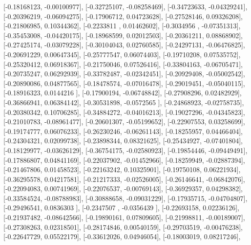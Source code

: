 \documentclass{article}
\begin{document}
       [-0.18168123, -0.00100977],
       [-0.32725107, -0.08258469],
       [-0.34723633, -0.04329241],
       [-0.20396219, -0.06094275],
       [-0.17906712,  0.04723628],
       [-0.27528146,  0.09326208],
       [-0.21806985,  0.10344362],
       [-0.2233811 ,  0.01462602],
       [-0.3034956 , -0.07351313],
       [-0.35453008, -0.04420175],
       [-0.18968599,  0.02012503],
       [-0.20361211,  0.08868902],
       [-0.27425174, -0.03079228],
       [-0.30104043,  0.02760585],
       [-0.24297131, -0.06476825],
       [-0.20691229,  0.00647345],
       [-0.25777547,  0.06074403],
       [-0.19710208,  0.07535752],
       [-0.25320412,  0.06918367],
       [-0.21750046,  0.07526416],
       [-0.33804163, -0.06705471],
       [-0.20735247,  0.06292939],
       [-0.33782487, -0.02342451],
       [-0.20929408, -0.05002542],
       [-0.20890086,  0.04877565],
       [-0.18478574, -0.07016478],
       [-0.29019451, -0.05040115],
       [-0.18916323,  0.0144216 ],
       [-0.17900194, -0.06748842],
       [-0.27908296,  0.02482929],
       [-0.36866941,  0.06384142],
       [-0.30531898, -0.0572565 ],
       [-0.24868923, -0.02758735],
       [-0.20380342,  0.10706285],
       [-0.34884272, -0.04016213],
       [-0.19027296, -0.04345823],
       [-0.21010783, -0.08961477],
       [-0.20601307, -0.05199652],
       [-0.22907553,  0.03258699],
       [-0.19174777,  0.06076233],
       [-0.26230246, -0.06261143],
       [-0.18255957,  0.04466404],
       [-0.24304321,  0.02099738],
       [-0.23898344,  0.08321625],
       [-0.25434927, -0.07401804],
       [-0.18129977, -0.03626129],
       [-0.36754175, -0.02580923],
       [-0.19854446, -0.09449491],
       [-0.17886807,  0.04841169],
       [-0.22037902, -0.01452966],
       [-0.18259949, -0.02887394],
       [-0.21467806,  0.01458523],
       [-0.22163242,  0.10325901],
       [-0.19750108,  0.06221934],
       [-0.36295578,  0.04217581],
       [-0.21217333, -0.02526005],
       [-0.26146641, -0.06842076],
       [-0.22094083,  0.00741969],
       [-0.22076537, -0.00769143],
       [-0.36929357,  0.04298382],
       [-0.33584524, -0.08788983],
       [-0.30888658, -0.09031229],
       [-0.17935715, -0.04704807],
       [-0.29496541,  0.0836303 ],
       [-0.2347507 , -0.0356439 ],
       [-0.22693158,  0.02236126],
       [-0.21937482, -0.08642566],
       [-0.19890161,  0.07809605],
       [-0.21998811, -0.00189007],
       [-0.27308263,  0.02318501],
       [-0.28174846,  0.00540159],
       [-0.29703519, -0.00476238],
       [-0.22647729,  0.05522179],
       [-0.33612026,  0.04946054],
       [-0.18003019,  0.08217246],
\end{document}
